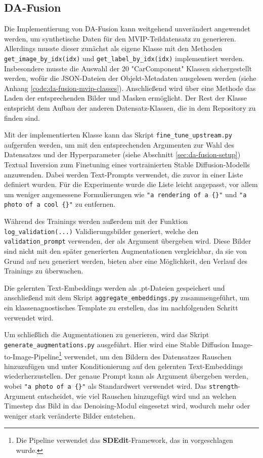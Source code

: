 \subsection{DA-Fusion} \label{sec:da-fusion-implementation}

Die Implementierung von DA-Fusion kann weitgehend unverändert angewendet werden, um synthetische Daten für den MVIP-Teildatensatz zu generieren. Allerdings musste dieser zunächst als eigene Klasse mit den Methoden \lstinline{get_image_by_idx(idx)} und \lstinline{get_label_by_idx(idx)} implementiert werden. Insbesondere musste die Auswahl der 20 "CarComponent" Klassen sichergestellt werden, wofür die JSON-Dateien der Objekt-Metadaten ausgelesen werden (siehe Anhang \ref{code:da-fusion-mvip-classes}). Anschließend wird über eine Methode das Laden der entsprechenden Bilder und Masken ermöglicht. Der Rest der Klasse entspricht dem Aufbau der anderen Datensatz-Klassen, die in dem Repository zu finden sind.

Mit der implementierten Klasse kann das Skript \lstinline{fine_tune_upstream.py} aufgerufen werden, um mit den entsprechenden Argumenten zur Wahl des Datensatzes und der Hyperparameter (siehe Abschnitt \ref{sec:da-fusion-setup}) Textual Inversion zum Finetuning eines vortrainierten Stable Diffusion-Modells anzuwenden. Dabei werden Text-Prompts verwendet, die zuvor in einer Liste definiert wurden. Für die Experimente wurde die Liste leicht angepasst, vor allem um weniger angemessene Formulierungen wie \lstinline|"a rendering of a {}"| und \lstinline|"a photo of a cool {}"| zu entfernen.

Während des Trainings werden außerdem mit der Funktion \lstinline{log_validation(...)} Validierungsbilder generiert, welche den \lstinline{validation_prompt} verwenden, der als Argument übergeben wird. Diese Bilder sind nicht mit den später generierten Augmentationen vergleichbar, da sie von Grund auf neu generiert werden, bieten aber eine Möglichkeit, den Verlauf des Trainings zu überwachen. %

Die gelernten Text-Embeddings werden als .pt-Dateien gespeichert und anschließend mit dem Skript \lstinline{aggregate_embeddings.py} zusammengeführt, um ein klassenagnostisches Template zu erstellen, das im nachfolgenden Schritt verwendet wird.

Um schließlich die Augmentationen zu generieren, wird das Skript \lstinline{generate_augmentations.py} ausgeführt. Hier wird eine Stable Diffusion Image-to-Image-Pipeline\footnote{Die Pipeline verwendet das \textbf{SDEdit}-Framework, das in \parencite{Meng2022sdedit} vorgeschlagen wurde.} verwendet, um den Bildern des Datensatzes Rauschen hinzuzufügen und unter Konditionierung auf den gelernten Text-Embeddings wiederherzustellen. Der genaue Prompt kann als Argument übergeben werden, wobei \lstinline|"a photo of a {}"| als Standardwert verwendet wird. Das \lstinline{strength}-Argument entscheidet, wie viel Rauschen hinzugefügt wird und an welchen Timestep das Bild in das Denoising-Modul eingesetzt wird, wodurch mehr oder weniger stark veränderte Bilder entstehen.

